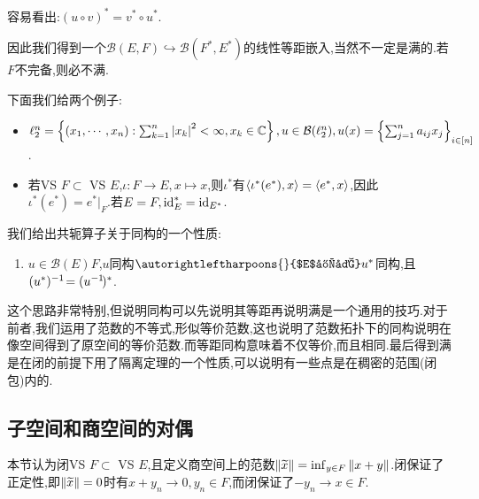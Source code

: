 \documentclass{article}
\newcommand{\mcBfunc}[1]{\mathcal{B}(#1)}
\begin{document}
容易看出:$(u\circ v)^*=v^*\circ u^*$.

因此我们得到一个$\mcBfunc{E,F}\hookrightarrow \mcBfunc{F^*,E^*}$的线性等距嵌入,当然不一定是满的.若$F$不完备,则必不满.

下面我们给两个例子:\begin{itemize}
    \item $\ell_2^n=\cbr{(x_1,\cdots,x_n):\sum_{k=1}^n \abs{x_k}^2<\infty,x_k\in \C},u\in \mcBfunc{\ell_2^n},u(x)=\cbr{\sum_{j=1}^n a_{ij}x_j}_{i\in [n]}$.\tbc
    \item 若VS $F\subset$ VS $E$,$\iota:F\to E,x\mapsto x$,则$\iota^*$有$\left<\iota^*(e^*),x\right>=\left<e^*,x\right>$,因此$\iota^*(e^*)=e^*|_F$.若$E=F, \mathrm{id}_E^*=\mathrm{id}_{E^*}$.
\end{itemize}

我们给出共轭算子关于同构的一个性质:\begin{enumerate}
    \item $u\in \mcBfunc{E}{F}$,$u$同构$\autorightleftharpoons{}{$E$完备} u^*$同构,且$(u^*)^{-1}\!=(u^{-1}\!)^*$.\\
\end{enumerate}
这个思路非常特别,但说明同构可以先说明其等距再说明满是一个通用的技巧.对于前者,我们运用了范数的不等式,形似等价范数,这也说明了范数拓扑下的同构说明在像空间得到了原空间的等价范数.而等距同构意味着不仅等价,而且相同.最后得到满是在闭的前提下用了隔离定理的一个性质,可以说明有一些点是在稠密的范围(闭包)内的.

\subsection{子空间和商空间的对偶}
本节认为闭VS $F\subset$ VS $E$,且定义商空间上的范数$\left\|\widetilde{x}\right\|=\inf_{y\in F}\left\|x+y\right\|$.闭保证了正定性,即$\left\|\widetilde{x}\right\|=0$时有$x+y_n\to 0, y_n\in F$,而闭保证了$-y_n\to x\in F$.
\end{document}
